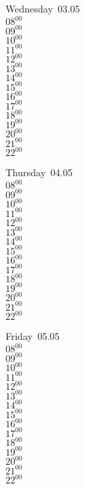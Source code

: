 \documentclass[11pt,a4paper]{book}\usepackage[]{graphicx}\usepackage[]{color}
\begin{document}
\begin{weekdaybox}
  Wednesday~03.05\\
  { 
  \vfill
  $08^{00}$\\
$09^{00}$\\
$10^{00}$\\
$11^{00}$\\
$12^{00}$\\
$13^{00}$\\
$14^{00}$\\
$15^{00}$\\
$16^{00}$\\
$17^{00}$\\
$18^{00}$\\
$19^{00}$\\
$20^{00}$\\
$21^{00}$\\
$22^{00}$\\
  }
\end{weekdaybox}
\clearpage
\begin{headerbox}
\end{headerbox}
\begin{weekdaybox}
  Thursday~04.05\\
  { 
  \vfill
  $08^{00}$\\
$09^{00}$\\
$10^{00}$\\
$11^{00}$\\
$12^{00}$\\
$13^{00}$\\
$14^{00}$\\
$15^{00}$\\
$16^{00}$\\
$17^{00}$\\
$18^{00}$\\
$19^{00}$\\
$20^{00}$\\
$21^{00}$\\
$22^{00}$\\
  }
\end{weekdaybox} 
\begin{weekdaybox}
  Friday~05.05\\
  { 
  \vfill
  $08^{00}$\\
$09^{00}$\\
$10^{00}$\\
$11^{00}$\\
$12^{00}$\\
$13^{00}$\\
$14^{00}$\\
$15^{00}$\\
$16^{00}$\\
$17^{00}$\\
$18^{00}$\\
$19^{00}$\\
$20^{00}$\\
$21^{00}$\\
$22^{00}$\\
  }
\end{weekdaybox}
\end{document}
